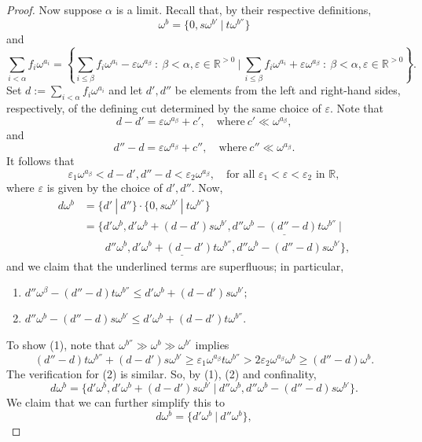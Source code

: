 \begin{proof}
Now suppose $\alpha$ is a limit.  Recall that, by their respective definitions,
$$\omega^b=\{0, s\omega^{b'} \ | \ t\omega^{b''}\}$$
and
$$\sum_{i<\alpha}f_i\omega^{a_i} = \left \{ \sum_{i\leq \beta} f_i\omega^{a_i} - \varepsilon \omega^{a_\beta} \ : \ \beta<\alpha, \varepsilon\in \mathds{R}^{>0} \ \biggl | \  \sum_{i\leq \beta} f_i\omega^{a_i} + \varepsilon \omega^{a_\beta} \ : \ \beta<\alpha, \varepsilon\in \mathds{R}^{>0}\right \}.$$
Set $d:=\sum_{i<\alpha}f_i\omega^{a_i}$ and let $d', d''$ be elements from the left and right-hand sides, respectively, of the defining cut determined by the same choice of $\varepsilon$.  Note that
$$d-d' = \varepsilon \omega^{a_\beta} + c', \quad \text{where} \ c'\ll \omega^{a_\beta},$$
and
$$d''-d = \varepsilon \omega^{a_\beta} + c'', \quad \text{where} \ c''\ll \omega^{a_\beta}.$$	
It follows that
\begin{equation}\varepsilon_1\omega^{a_\beta}<d-d', d''-d<\varepsilon_2\omega^{a_\beta}, \quad \text{for all $\varepsilon_1<\varepsilon<\varepsilon_2$ in $\mathds{R}$}, \tag{$*$}\end{equation}
where $\varepsilon$ is given by the choice of $d', d''$.  Now,
\begin{align*} d\omega^b & = \{d' \ | \ d''\} \cdot \{0, s\omega^{b'} \ | \ t\omega^{b''}\} \\
			& = \{d'\omega^b, d' \omega^b+(d-d')s\omega^{b'}, \underline{d''\omega^b-(d''-d)t\omega^{b''}} \ | \\
			& \qquad  d''\omega^b, \underline{d'\omega^b+(d-d')t\omega^{b''}}, d''\omega^b-(d''-d)s\omega^{b'}\},\end{align*}
and we claim that the underlined terms are superfluous; in particular, 
\begin{enumerate}[(1)]
\item $d''\omega^\beta - (d''-d)t\omega^{b''} \leq d'\omega^b + (d-d')s\omega^{b'};$
\item  $d''\omega^b- (d''-d)s\omega^{b'}\leq d'\omega^b + (d-d')t\omega^{b''}$.
\end{enumerate}
To show (1), note that $\omega^{b''}\gg \omega^b\gg \omega^{b'}$ implies
$$(d''-d)t\omega^{b''}+(d-d')s\omega^{b'}\geq \varepsilon_1\omega^{a_\beta}t\omega^{b''} > 2\varepsilon_2 \omega^{a_\beta}\omega^b\geq (d''-d)\omega^b.$$
The verification for (2) is similar.  So, by (1), (2) and confinality, 
$$ d\omega^b =  \{d'\omega^b, d' \omega^b+(d-d')s\omega^{b'}  \ | \
		 d''\omega^b,  d''\omega^b-(d''-d)s\omega^{b'}\}.$$
We claim that we can further simplify this to 
$$d\omega^b=\{d'\omega^b \ | \ d''\omega^b\},$$

\end{proof}
